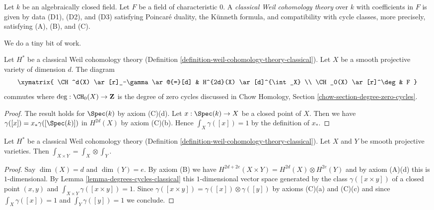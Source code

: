 \begin{definition}
\label{definition-weil-cohomology-theory-classical}
Let $k$ be an algebraically closed field.
Let $F$ be a field of characteristic $0$.
A {\it classical Weil cohomology theory} over $k$ with coefficients in $F$
is given by data (D1), (D2), and (D3) satisfying
Poincar\'e duality, the K\"unneth formula, and compatibility
with cycle classes, more precisely, satisfying (A), (B), and (C).
\end{definition}

\noindent
We do a tiny bit of work.

\begin{lemma}
\label{lemma-degrees-cycles-classical}
Let $H^*$ be a classical Weil cohomology theory
(Definition \ref{definition-weil-cohomology-theory-classical}).
Let $X$ be a smooth projective variety of dimension $d$. The diagram
$$
\xymatrix{
\CH^d(X) \ar[r]_-\gamma \ar@{=}[d] &
H^{2d}(X) \ar[d]^{\int_X} \\
\CH_0(X) \ar[r]^\deg & F
}
$$
commutes where $\deg : \CH_0(X) \to \mathbf{Z}$ is the degree of
zero cycles discussed in Chow Homology, Section
\ref{chow-section-degree-zero-cycles}.
\end{lemma}

\begin{proof}
The result holds for $\Spec(k)$ by axiom (C)(d). Let $x : \Spec(k) \to X$
be a closed point of $X$. Then we have $\gamma([x]) = x_*\gamma([\Spec(k)])$
in $H^{2d}(X)$ by axiom (C)(b). Hence $\int_X \gamma([x]) = 1$ by the
definition of $x_*$.
\end{proof}

\begin{lemma}
\label{lemma-trace-product-classical}
Let $H^*$ be a classical Weil cohomology theory
(Definition \ref{definition-weil-cohomology-theory-classical}).
Let $X$ and $Y$ be smooth projective varieties.
Then $\int_{X \times Y} = \int_X \otimes \int_Y$.
\end{lemma}

\begin{proof}
Say $\dim(X) = d$ and $\dim(Y) = e$. By axiom (B) we have
$H^{2d + 2e}(X \times Y) = H^{2d}(X) \otimes H^{2e}(Y)$
and by axiom (A)(d) this is $1$-dimensional.
By Lemma \ref{lemma-degrees-cycles-classical}
this $1$-dimensional vector space generated by the
class $\gamma([x \times y])$ of a closed point $(x, y)$ and
$\int_{X \times Y} \gamma([x \times y]) = 1$.
Since $\gamma([x \times y]) = \gamma([x]) \otimes \gamma([y])$
by axioms (C)(a) and (C)(c) and since $\int_X \gamma([x]) = 1$ and
$\int_Y \gamma([y]) = 1$ we conclude.
\end{proof}

